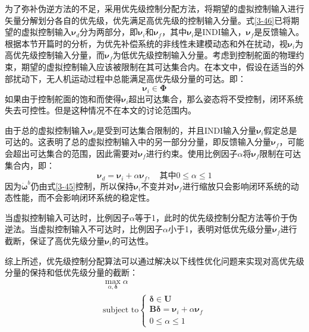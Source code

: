 为了弥补伪逆方法的不足，采用优先级控制分配方法，将期望的虚拟控制输入进行矢量分解划分各自的优先级，优先满足高优先级的控制输入分量。式\eqref{3-46}已将期望的虚拟控制输入$\boldsymbol{\nu}_d$分为两部分，即$\boldsymbol{\nu}_i$和$\boldsymbol{\nu}_f$，其中$\boldsymbol{\nu}_i$是INDI输入，$\boldsymbol{\nu}_f$是反馈输入。根据本节开篇时的分析，为优先补偿系统的非线性未建模动态和外在扰动，视$\boldsymbol{\nu}_i$为高优先级控制输入分量，而$\boldsymbol{\nu}_f$为低优先级控制输入分量。考虑到控制舵面的物理约束，期望的虚拟控制输入应该被限制在其可达集合内。在本文中，假设在适当的外部扰动下，无人机运动过程中总能满足高优先级分量的可达。即：
\begin{equation}
    \boldsymbol{\nu}_i\in\boldsymbol\Phi
    \label{3-58}
\end{equation}
如果由于控制舵面的饱和而使得$\boldsymbol{\nu}_i$超出可达集合，那么姿态将不受控制，闭环系统失去可控性。但是这种情况不在本文的讨论范围内。

由于总的虚拟控制输入$\boldsymbol{\nu}_d$是受到可达集合限制的，并且INDI输入分量$\boldsymbol{\nu}_i$假定总是可达的。这表明了总的虚拟控制输入中的另一部分分量，即反馈输入分量$\boldsymbol{\nu}_f$，可能会超出可达集合的范围，因此需要对$\boldsymbol{\nu}_f$进行约束。使用比例因子$\alpha$将$\boldsymbol{\nu}_f$限制在可达集合内，即：
\begin{equation}
    \boldsymbol{\nu}_d=\boldsymbol{\nu}_i+\alpha\boldsymbol{\nu}_f,\quad\text{其中}0\leq\alpha\leq1
    \label{3-59}
\end{equation}
因为$\dot{\boldsymbol{\omega}}^b$仍由式\eqref{3-45}控制，所以保持$\boldsymbol{\nu}_i$不变并对$\boldsymbol{\nu}_f$进行缩放只会影响闭环系统的动态性能，而不会影响闭环系统的稳定性。

当虚拟控制输入可达时，比例因子$\alpha$等于1，此时的优先级控制分配方法等价于伪逆法。当虚拟控制输入不可达时，比例因子$\alpha$小于1，表明对低优先级分量$\boldsymbol{\nu}_f$进行截断，保证了高优先级分量$\boldsymbol{\nu}_i$的可达性。

综上所述，优先级控制分配算法可以通过解决以下线性优化问题来实现对高优先级分量的保持和低优先级分量的截断：
\begin{equation}
    \begin{gathered}
        \max_{\alpha,\boldsymbol{\delta}}\alpha \\
        \text{subject  to}
        \begin{cases}
        \boldsymbol{\delta}\in\boldsymbol{U} \\
        \boldsymbol{B}\boldsymbol{\delta}=\boldsymbol{\nu}_i+\alpha\boldsymbol{\nu}_f \\
        0\leq\alpha\leq1
        \end{cases}
    \end{gathered}
    \label{3-60}
\end{equation}

